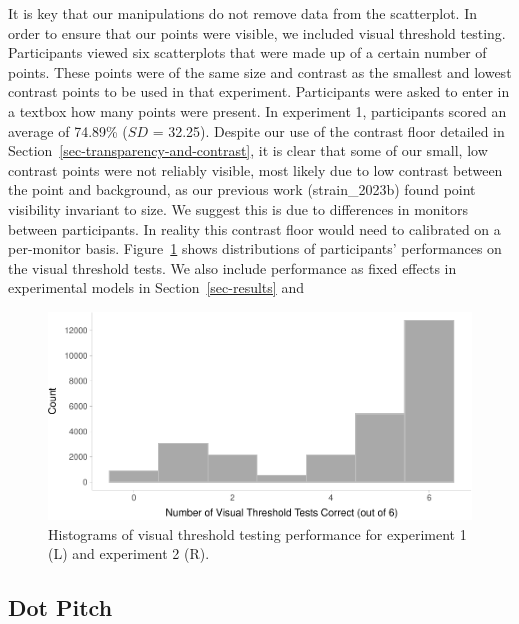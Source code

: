 \documentclass[manuscript, review, anonymous, screen]{acmart}
\begin{document}
It is key that our manipulations do not remove data from the
scatterplot. In order to ensure that our points were visible, we
included visual threshold testing. Participants viewed six scatterplots
that were made up of a certain number of points. These points were of
the same size and contrast as the smallest and lowest contrast points to
be used in that experiment. Participants were asked to enter in a
textbox how many points were present. In experiment 1, participants
scored an average of 74.89\% (\(SD\) = 32.25). Despite our use of the
contrast floor detailed in Section~\ref{sec-transparency-and-contrast},
it is clear that some of our small, low contrast points were not
reliably visible, most likely due to low contrast between the point and
background, as our previous work (strain\_2023b) found point visibility
invariant to size. We suggest this is due to differences in monitors
between participants. In reality this contrast floor would need to
calibrated on a per-monitor basis. Figure~\ref{fig-VT-hist} shows
distributions of participants' performances on the visual threshold
tests. We also include performance as fixed effects in experimental
models in Section~\ref{sec-results} and

\begin{figure}

{\centering \includegraphics{size_and_contrast_new_files/figure-pdf/fig-VT-hist-1.pdf}

}

\caption{\label{fig-VT-hist}Histograms of visual threshold testing
performance for experiment 1 (L) and experiment 2 (R).}

\end{figure}

\hypertarget{sec-dot-pitch}{%
\subsection{Dot Pitch}\label{sec-dot-pitch}}
\end{document}
